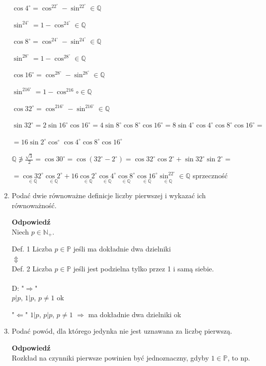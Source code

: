 \documentclass[12pt,a4paper]{article}
\theoremstyle{break}
\newcommand{\Odp}[1]{
		\begin{mdframed}[style=zadanie]
			\textbf{Odpowiedź}\\
			#1
		\end{mdframed}
	}
\begin{document}
\begin{enumerate}[1.]
{		$\cos 4^\circ = \cos^22^\circ - \sin^22^\circ \in \mathbb{Q}$
		
		$\sin^24^\circ = 1-\cos^24^\circ \in \mathbb{Q}$
		
		$\cos 8^\circ = \cos^24^\circ - \sin^24^\circ \in \mathbb{Q}$
		
		$\sin^28^\circ = 1-\cos^28^\circ \in \mathbb{Q}$
		
		$\cos 16^\circ = \cos^28^\circ - \sin^28^\circ \in \mathbb{Q}$
		
		$\sin^216^\circ = 1-\cos^216\circ \in \mathbb{Q}$
		
		$\cos 32^\circ = \cos^216^\circ - \sin^216^\circ \in \mathbb{Q}$
		
		$\sin32^\circ= 2\sin16^\circ\cos16^\circ=4\sin8^\circ\cos8^\circ\cos16^\circ=8\sin4^\circ\cos4^\circ\cos8^\circ\cos16^\circ=$
		
		$=16\sin2^\circ\cos^\circ\cos4^\circ\cos8^\circ\cos16^\circ$
		
		$\mathbb{Q}\not\ni\frac{\sqrt{3}}{2} = \cos30^\circ = \cos(32^\circ - 2^\circ) = \cos32^\circ\cos2^\circ + \sin32^\circ\sin2^\circ=$
		
		$= \underset{\in \mathbb{Q}}{\cos32^\circ}\underset{\in \mathbb{Q}}{\cos2^\circ} + 16\underset{\in \mathbb{Q}}{\cos2^\circ}\underset{\in \mathbb{Q}}{\cos4^\circ}\underset{\in \mathbb{Q}}{\cos8^\circ}\underset{\in \mathbb{Q}}{\cos16^\circ}\underset{\in \mathbb{Q}}{\sin^22^\circ} \in \mathbb{Q}$ sprzeczność
	}
	
	\item Podać dwie równoważne deﬁnicje liczby pierwszej i wykazać ich równoważność.
	\Odp{
		Niech $p\in \mathbb{N}_+$.
		
		Def. 1 Liczba $p\in \mathbb{P}$ jeśli ma dokładnie dwa dzielniki\\
		$\Updownarrow$\\
		Def. 2 Liczba $p\in \mathbb{P}$ jeśli jest podzielna tylko przez 1 i samą siebie.\\\\
		
		D: "$\Rightarrow$"\\
		$p|p$, $1|p$, $p\neq1$ ok
		
		"$\Leftarrow$"
		$1|p$, $p|p$, $p\neq1$ $\Rightarrow$ ma dokładnie dwa dzielniki ok
		
	}
	
	\item Podać powód, dla którego jedynka nie jest uznawana za liczbę pierwszą.
	\Odp{
		Rozkład na czynniki pierwsze powinien być jednoznaczny, gdyby $1\in\mathbb{P}$, to np.
		
}
\end{enumerate}
\end{document}
